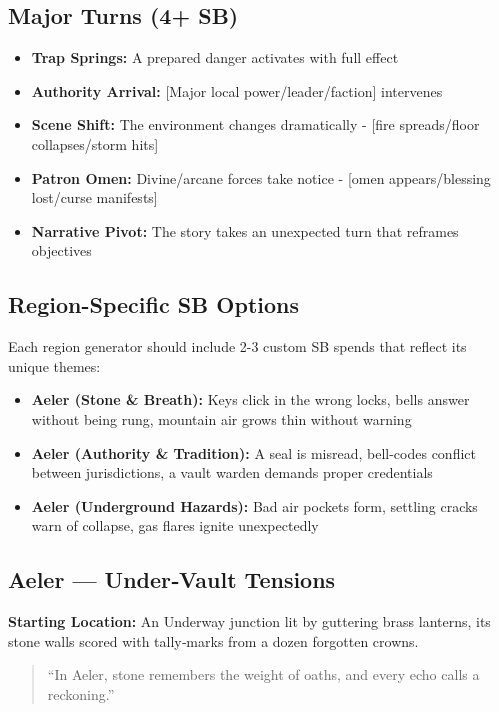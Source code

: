 \subsection*{Major Turns (4+ SB)}
\begin{itemize}
\item \textbf{Trap Springs:} A prepared danger activates with full effect
\item \textbf{Authority Arrival:} [Major local power/leader/faction] intervenes
\item \textbf{Scene Shift:} The environment changes dramatically - [fire spreads/floor collapses/storm hits]
\item \textbf{Patron Omen:} Divine/arcane forces take notice - [omen appears/blessing lost/curse manifests]
\item \textbf{Narrative Pivot:} The story takes an unexpected turn that reframes objectives
\end{itemize}

\subsection*{Region-Specific SB Options}
Each region generator should include 2-3 custom SB spends that reflect its unique themes:

\begin{itemize}
\item \textbf{Aeler (Stone \& Breath):} Keys click in the wrong locks, bells answer without being rung, mountain air grows thin without warning
\item \textbf{Aeler (Authority \& Tradition):} A seal is misread, bell-codes conflict between jurisdictions, a vault warden demands proper credentials
\item \textbf{Aeler (Underground Hazards):} Bad air pockets form, settling cracks warn of collapse, gas flares ignite unexpectedly
\end{itemize}

\subsection*{Aeler — Under‑Vault Tensions}
\textbf{Starting Location:} An Underway junction lit by guttering brass lanterns, its stone walls scored with tally‑marks from a dozen forgotten crowns.
\begin{quote}
“In Aeler, stone remembers the weight of oaths, and every echo calls a reckoning.”
\end{quote}


